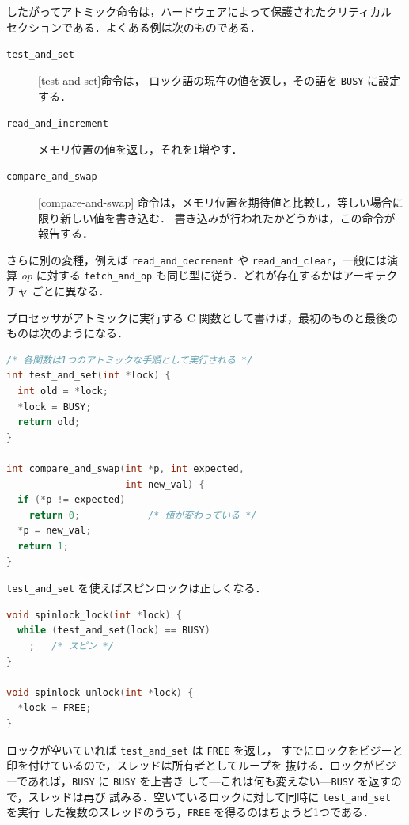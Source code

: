 \documentclass[../main.tex]{subfiles}
\begin{document}
したがってアトミック命令は，ハードウェアによって保護されたクリティカル
セクションである．よくある例は次のものである．
\begin{description}
  \item[\texttt{test\_and\_set}]
    [test-and-set]命令は，
    ロック語の現在の値を返し，その語を \texttt{BUSY} に設定する．
  \item[\texttt{read\_and\_increment}] メモリ位置の値を返し，それを1増やす．
  \item[\texttt{compare\_and\_swap}]
    [compare-and-swap]%
    命令は，メモリ位置を期待値と比較し，等しい場合に限り新しい値を書き込む．
    書き込みが行われたかどうかは，この命令が報告する．%
\end{description}
さらに別の変種，例えば \texttt{read\_and\_decrement} や
\texttt{read\_and\_clear}，一般には演算 \emph{op} に対する
\texttt{fetch\_and\_op} も同じ型に従う．どれが存在するかはアーキテクチャ
ごとに異なる．

プロセッサがアトミックに実行する C 関数として書けば，最初のものと最後の
ものは次のようになる．
\begin{lstlisting}[language=C, numbers=none]
/* 各関数は1つのアトミックな手順として実行される */
int test_and_set(int *lock) {
  int old = *lock;
  *lock = BUSY;
  return old;
}

int compare_and_swap(int *p, int expected,
                     int new_val) {
  if (*p != expected)
    return 0;            /* 値が変わっている */
  *p = new_val;
  return 1;
}
\end{lstlisting}

\texttt{test\_and\_set} を使えばスピンロックは正しくなる．
\begin{lstlisting}[language=C, numbers=none]
void spinlock_lock(int *lock) {
  while (test_and_set(lock) == BUSY)
    ;   /* スピン */
}

void spinlock_unlock(int *lock) {
  *lock = FREE;
}
\end{lstlisting}
ロックが空いていれば \texttt{test\_and\_set} は \texttt{FREE} を返し，
すでにロックをビジーと印を付けているので，スレッドは所有者としてループを
抜ける．ロックがビジーであれば，\texttt{BUSY} に \texttt{BUSY} を上書き
して---これは何も変えない---\texttt{BUSY} を返すので，スレッドは再び
試みる．空いているロックに対して同時に \texttt{test\_and\_set} を実行
した複数のスレッドのうち，\texttt{FREE} を得るのはちょうど1つである．%
\end{document}
